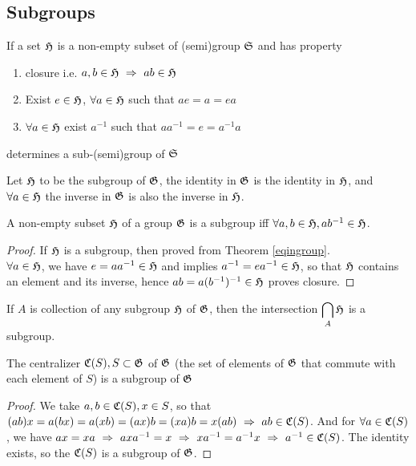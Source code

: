 	\subsection{Subgroups}
		\begin{definition}
		If a set $\mathfrak{H}$ is a non-empty subset of (semi)group $\mathfrak{S}$ and has property
		\begin{enumerate}
		\item closure i.e. $a,b\in\mathfrak{H}\hbox{$\textrm{ }\Rightarrow\textrm{ }$} ab\in\mathfrak{H}$
		\item Exist $e\in\mathfrak{H}$, $\forall a\in\mathfrak{H}$ such that $ae=a=ea$
		\item $\forall a\in\mathfrak{H}$ exist $a^{-1}$ such that $aa^{-1}=e=a^{-1}a$
		\end{enumerate}
		determines a sub-(semi)group of $\mathfrak{S}$
		\end{definition}
		\begin{theorem}\label{sub-id-inv}
		Let $\mathfrak{H}$ to be the subgroup of $\mathfrak{G}$, the identity in $\mathfrak{G}$ is the identity in $\mathfrak{H}$, and $\forall a\in\mathfrak{H}$ the inverse in $\mathfrak{G}$ is also the inverse in $\mathfrak{H}$.
		\end{theorem}
		\begin{theorem}
		A non-empty subset $\mathfrak{H}$ of a group $\mathfrak{G}$ is a subgroup iff $\forall a,b\in\mathfrak{H}, ab^{-1}\in\mathfrak{H}$.
		\end{theorem}
		\begin{proof}
		If $\mathfrak{H}$ is a subgroup, then proved from Theorem \ref{eqingroup}. \\
		$\forall a\in\mathfrak{H}$, we have $e=aa^{-1}\in\mathfrak{H}$ and implies $a^{-1}=ea^{-1}\in\mathfrak{H}$, so that $\mathfrak{H}$ contains an element and its inverse, hence $ab=a(b^{-1})^{-1}\in\mathfrak{H}$ proves closure.
		\end{proof}
		\begin{theorem}
		If $A$ is collection of any subgroup $\mathfrak{H}$ of $\mathfrak{G}$, then the intersection $\displaystyle\bigcap\limits_{A}\mathfrak{H}$ is a subgroup.
		\end{theorem}
		\begin{theorem}
		The centralizer $\mathfrak{C}(S), S\subset\mathfrak{G}$ of $\mathfrak{G}$ (the set of elements of $\mathfrak{G}$ that commute with each element of $S$) is a subgroup of $\mathfrak{G}$
		\end{theorem}
		\begin{proof}
		We take $a,b\in\mathfrak{C}(S), x\in S$, so that $(ab)x=a(bx)=a(xb)=(ax)b=(xa)b=x(ab)\hbox{$\textrm{ }\Rightarrow\textrm{ }$} ab\in\mathfrak{C}(S)$. And for $\forall a\in\mathfrak{C}(S)$, we have $ax=xa\hbox{$\textrm{ }\Rightarrow\textrm{ }$} axa^{-1}=x \hbox{$\textrm{ }\Rightarrow\textrm{ }$} xa^{-1}=a^{-1}x\hbox{$\textrm{ }\Rightarrow\textrm{ }$} a^{-1}\in\mathfrak{C}(S)$. The identity exists, so the $\mathfrak{C}(S)$ is a subgroup of $\mathfrak{G}$.
		\end{proof}
